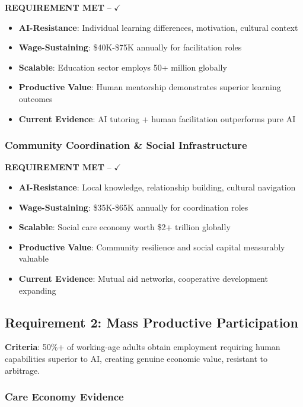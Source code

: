 \documentclass[11pt,a4paper]{article}
\newcommand{\greencheckmark}{{\color{validationgreen}\textbf{$\checkmark$}}}
\newcommand{\requirement}[1]{\textcolor{secondaryblue}{\textbf{#1}}}
\newcommand{\evidence}[1]{\textcolor{validationgreen}{\textbf{#1}}}
\begin{document}
\evidence{REQUIREMENT MET} -- \greencheckmark

\begin{itemize}[leftmargin=*]
\item \textbf{AI-Resistance}: Individual learning differences, motivation, cultural context
\item \textbf{Wage-Sustaining}: \$40K-\$75K annually for facilitation roles  
\item \textbf{Scalable}: Education sector employs 50+ million globally
\item \textbf{Productive Value}: Human mentorship demonstrates superior learning outcomes
\item \textbf{Current Evidence}: AI tutoring + human facilitation outperforms pure AI
\end{itemize}

\subsubsection{Community Coordination \& Social Infrastructure}

\evidence{REQUIREMENT MET} -- \greencheckmark

\begin{itemize}[leftmargin=*]
\item \textbf{AI-Resistance}: Local knowledge, relationship building, cultural navigation
\item \textbf{Wage-Sustaining}: \$35K-\$65K annually for coordination roles
\item \textbf{Scalable}: Social care economy worth \$2+ trillion globally  
\item \textbf{Productive Value}: Community resilience and social capital measurably valuable
\item \textbf{Current Evidence}: Mutual aid networks, cooperative development expanding
\end{itemize}

\subsection{Requirement 2: Mass Productive Participation}

\requirement{Criteria}: 50\%+ of working-age adults obtain employment requiring human capabilities superior to AI, creating genuine economic value, resistant to arbitrage.

\subsubsection{Care Economy Evidence}
\end{document}
